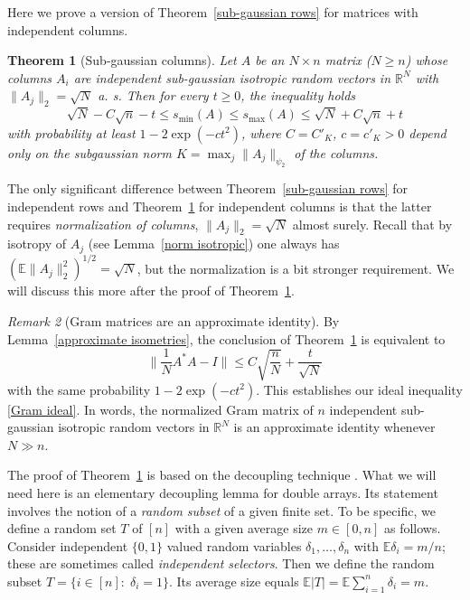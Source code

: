 \documentclass[10pt, openany]{book}
\newtheorem{theorem}{Theorem}[chapter]
\theoremstyle{remark}
\newtheorem{remark}[theorem]{Remark}
\def \R {\mathbb{R}}
\def \E {\mathbb{E}}
\def \d {\delta}
\def \psitwo {{\psi_2}}
\def \smin {s_{\min}}
\def \smax {s_{\max}}
\begin{document}
Here we prove a version of Theorem~\ref{sub-gaussian rows} for matrices with independent columns. 

\begin{theorem}[Sub-gaussian columns]				\label{sub-gaussian columns}
  Let $A$ be an $N \times n$ matrix ($N \ge n$) whose columns $A_i$ are independent
  sub-gaussian isotropic random vectors in $\R^N$ with $\|A_j\|_2 = \sqrt{N}$ a. s. 
  Then for every $t \ge 0$, the inequality holds
  \begin{equation}										\label{smin smax columns}
  \sqrt{N} - C \sqrt{n} - t \le \smin(A) \le \smax(A) \le \sqrt{N} + C \sqrt{n} + t
  \end{equation}
  with probability at least $1 - 2\exp(-ct^2)$, 
  where $C = C'_K$, $c = c'_K > 0$ depend only on the subgaussian norm 
  $K = \max_j \|A_j\|_\psitwo$ of the columns. 
\end{theorem}

The only significant difference between Theorem~\ref{sub-gaussian rows} for independent rows
and Theorem~\ref{sub-gaussian columns} for independent columns is 
that the latter requires {\em normalization of columns}, $\|A_j\|_2 = \sqrt{N}$ almost surely.
Recall that by isotropy of $A_j$ (see Lemma~\ref{norm isotropic}) 
one always has $(\E\|A_j\|_2^2)^{1/2} = \sqrt{N}$,
but the normalization is a bit stronger requirement.
We will discuss this more after the proof of Theorem~\ref{sub-gaussian columns}. 

\begin{remark}[Gram matrices are an approximate identity]
  By Lemma~\ref{approximate isometries}, the conclusion of Theorem~\ref{sub-gaussian columns}
  is equivalent to 
  $$
  \big\| \frac{1}{N} A^*A - I \| \le C \sqrt{\frac{n}{N}} + \frac{t}{\sqrt{N}}
  $$
  with the same probability $1 - 2\exp(-ct^2)$. This establishes our ideal inequality \eqref{Gram ideal}.
  In words, the normalized Gram matrix of $n$ independent sub-gaussian isotropic 
  random vectors in $\R^N$ is an approximate identity whenever $N \gg n$. 
\end{remark}


The proof of Theorem~\ref{sub-gaussian columns} is based on the decoupling technique \cite{dG}.
What we will need here is an elementary decoupling lemma for double arrays.
Its statement involves the notion of a {\em random subset}  of a given finite set.
To be specific, we define a random set $T$ of $[n]$ with a given average size $m \in [0,n]$
as follows. Consider independent $\{0,1\}$ valued random variables $\d_1,\ldots,\d_n$
with $\E\d_i = m/n$; these are sometimes called {\em independent selectors}. 
Then we define the random subset
$T = \{ i \in [n]:\; \d_i=1 \}$. Its average size equals $\E|T| = \E \sum_{i=1}^n \d_i = m$.
\end{document}
